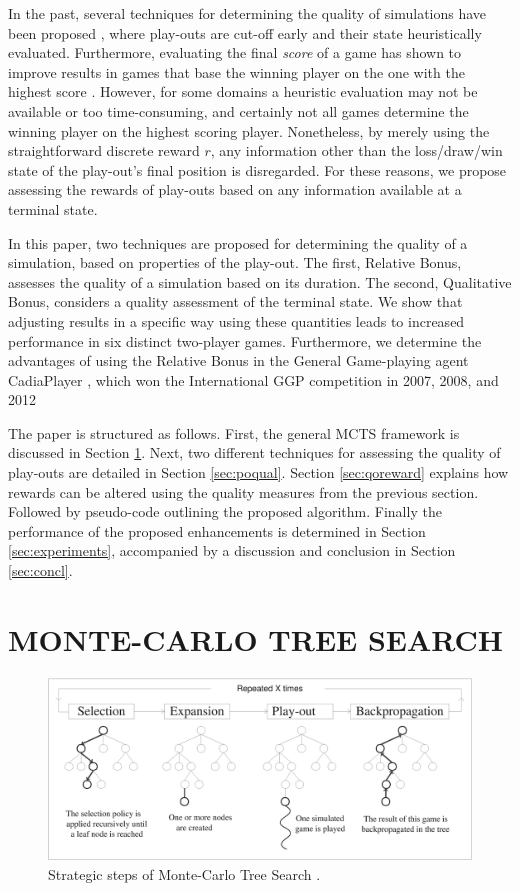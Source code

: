 \documentclass{ecai2014}
\begin{document}
In the past, several techniques for determining the quality of simulations have been proposed \cite{Winands2011}, where play-outs are cut-off early and their state heuristically evaluated. Furthermore, evaluating the final \emph{score} of a game has shown to improve results in games that base the winning player on the one with the highest score \cite{shibahara2008combining}. However, for some domains a heuristic evaluation may not be available or too time-consuming, and certainly not all games determine the winning player on the highest scoring player. Nonetheless, by merely using the straightforward discrete reward $r$, any information other than the loss/draw/win state of the play-out's final position is disregarded. For these reasons, we propose assessing the rewards of play-outs based on any information available at a terminal state.

In this paper, two techniques are proposed for determining the quality of a simulation, based on properties of the play-out. The first, Relative Bonus, assesses the quality of a simulation based on its duration. The second, Qualitative Bonus, considers a quality assessment of the terminal state. We show that adjusting results in a specific way using these quantities leads to increased performance in six distinct two-player games. Furthermore, we determine the advantages of using the Relative Bonus in the General Game-playing agent {\sc CadiaPlayer} \cite{bjornsson2009cadiaplayer}, which won the International GGP competition in 2007, 2008, and 2012

The paper is structured as follows. First, the general MCTS framework is discussed in Section \ref{sec:mcts}. Next, two different techniques for assessing the quality of play-outs are detailed in Section \ref{sec:poqual}. Section \ref{sec:qoreward} explains how rewards can be altered using the quality measures from the previous section. Followed by pseudo-code outlining the proposed algorithm. Finally the performance of the proposed enhancements is determined in Section \ref{sec:experiments}, accompanied by a discussion and conclusion in Section \ref{sec:concl}.

\section{MONTE-CARLO TREE SEARCH}
\label{sec:mcts}
\begin{figure}[ht]
	\centering
	\includegraphics[width=.45\textwidth]{img/figure1.eps}
	\caption{Strategic steps of Monte-Carlo Tree Search \cite{chaslot2008progressive}.}
	\label{fig:mcts-algorithm}
\end{figure}
\end{document}
